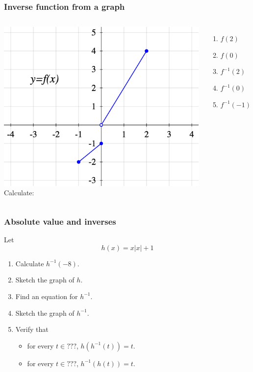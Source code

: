 \documentclass[14pt]{beamer}
\newcommand {\DS} [1] {${\displaystyle #1}$}
\newcommand{\p}{\pause}
\begin{document}

\begin{frame}
\frametitle{Inverse function from a graph}

\begin{columns}[c]

\includegraphics[scale=.4]{G12}
Calculate:
\begin{enumerate}
	\item  \DS{f(2)}
	\item  \DS{f(0)}
	\item  \DS{f^{-1}(2)}
	\item  \DS{f^{-1}(0)}
	\item  \DS{f^{-1}(-1)}
\end{enumerate}
\end{columns}

\end{frame}
\begin{frame}[t]
\frametitle{Absolute value and inverses}

Let
	$$
		h(x) = x |x| + 1
	$$
\begin{enumerate}
	\item  Calculate \DS{h^{-1}(-8)}.
\p
	\item Sketch the graph of $h$.
	\item  Find an equation for \DS{h^{-1}}.
	\item Sketch the graph of \DS{h^{-1}}.
	\item  Verify that
		\begin{itemize} \normalsize
			\item  for every \DS{t \in \boxed{???}}, \; \DS{h(h^{-1}(t)) = t}.
			\item for every \DS{t \in \boxed{???}}, \; \DS{h^{-1}(h(t)) = t}.
		\end{itemize}
\end{enumerate}

\end{frame}
\end{document}
